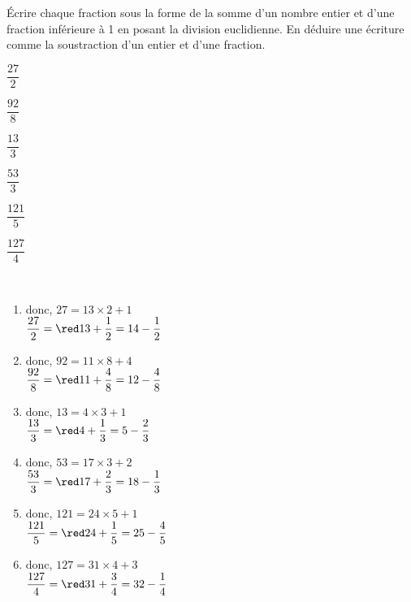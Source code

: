 \begin{exercice*}
   Écrire chaque fraction sous la forme de la somme d'un nombre entier et d'une fraction inférieure à 1 en posant la division euclidienne. En déduire une écriture comme la soustraction d'un entier et d'une fraction.   
      \begin{multicols}{3}
         \begin{enumerate}
            \begin{spacing}{2}
               \item $\dfrac{27}2$
               \item $\dfrac{92}8$
               \item $\dfrac{13}{3}$
               \item $\dfrac{53}{3}$
               \item $\dfrac{121}{5}$
               \item $\dfrac{127}{4}$
            \end{spacing}
         \end{enumerate}
      \end{multicols}   
\end{exercice*}

\begin{corrige}
   \ \\ [-5mm]
   \begin{enumerate}
      \item {} donc, $27 =13\times2+1$ \\ [1mm]
         $\dfrac{27}2 =\red 13+\dfrac12 =14-\dfrac12$ \medskip
      \item {} donc, $92 =11\times8+4$ \\ [1mm]
         $\dfrac{92}8 =\red 11+\dfrac48 =12-\dfrac48$ \medskip
      \item {} donc, $13 =4\times3+1$ \\ [1mm]
         $\dfrac{13}{3} =\red 4+\dfrac13 =5-\dfrac23$ \medskip
      \item {} donc, $53 =17\times3+2$ \\ [1mm]
         $\dfrac{53}{3} =\red 17+\dfrac23 =18-\dfrac13$ \medskip
      \item {} donc, $121 =24\times5+1$ \\ [1mm]
         $\dfrac{121}{5} =\red 24+\dfrac15 =25-\dfrac45$ \medskip
      \item {} donc, $127 =31\times4+3$ \\ [1mm]
         $\dfrac{127}{4} =\red 31+\dfrac34 =32-\dfrac14$
   \end{enumerate}
\end{corrige}